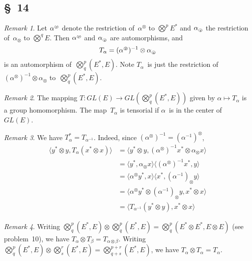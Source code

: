 \documentclass[letterpaper,12pt]{article}
\newcommand{\tprod}{\otimes}
\newcommand{\bigtprod}{\bigotimes}
\newcommand{\medtprod}{{\textstyle\bigtprod}}
\newcommand{\sprod}[2]{\langle#1,#2\rangle}
\newcommand{\circled}[1]{\text{\tiny\textcircled{\textit{#1}}}}
\theoremstyle{definition}
\theoremstyle{remark}
\newtheorem*{rmk}{Remark}
\begin{document}
\subsection*{\S~14}
\begin{rmk}
Let \(\alpha^{\circled{p}}\) denote the restriction of~\(\alpha^{\tprod}\) to \(\medtprod^p E^*\) and \(\alpha_{\circled{q}}\) the restriction of~\(\alpha_{\tprod}\) to \(\medtprod^q E\). Then \(\alpha^{\circled{p}}\) and \(\alpha_{\circled{q}}\) are automorphisms, and
\[T_{\alpha}=(\alpha^{\circled{p}})^{-1}\tprod\alpha_{\circled{q}}\]
is an automorphism of~\(\medtprod^p_q(E^*,E)\). Note \(T_{\alpha}\)~is just the restriction of \((\alpha^{\tprod})^{-1}\tprod\alpha_{\tprod}\) to~\(\medtprod^p_q(E^*,E)\).
\end{rmk}

\begin{rmk}
The mapping \(T:GL(E)\to GL(\medtprod^p_q(E^*,E))\) given by \(\alpha\mapsto T_{\alpha}\) is a group homomorphism. The map~\(T_{\alpha}\) is tensorial if \(\alpha\)~is in the center of~\(GL(E)\).
\end{rmk}

\begin{rmk}
We have \(T_{\alpha}^*=T_{\alpha^{-1}}\). Indeed, since \((\alpha^{\tprod})^{-1}=(\alpha^{-1})^{\tprod}\),
\begin{align*}
\sprod{y^*\tprod y}{T_{\alpha}(x^*\tprod x)}&=\sprod{y^*\tprod y}{(\alpha^{\tprod})^{-1}x^*\tprod\alpha_{\tprod}x}\\
	&=\sprod{y^*}{\alpha_{\tprod}x}\sprod{(\alpha^{\tprod})^{-1}x^*}{y}\\
	&=\sprod{\alpha^{\tprod}y^*}{x}\sprod{x^*}{(\alpha^{-1})_{\tprod}y}\\
	&=\sprod{\alpha^{\tprod}y^*\tprod(\alpha^{-1})_{\tprod}y}{x^*\tprod x}\\
	&=\sprod{T_{\alpha^{-1}}(y^*\tprod y)}{x^*\tprod x}
\end{align*}
\end{rmk}

\begin{rmk}
Writing \(\medtprod^p_q(E^*,E)\tprod\medtprod^p_q(E^*,E)=\medtprod^p_q(E^*\tprod E^*,E\tprod E)\) (see problem~10), we have \(T_{\alpha}\tprod T_{\beta}=T_{\alpha\tprod\beta}\). Writing \(\medtprod^p_q(E^*,E)\tprod\medtprod^r_s(E^*,E)=\medtprod^{p+r}_{q+s}(E^*,E)\), we have \(T_{\alpha}\tprod T_{\alpha}=T_{\alpha}\).
\end{rmk}
\end{document}
